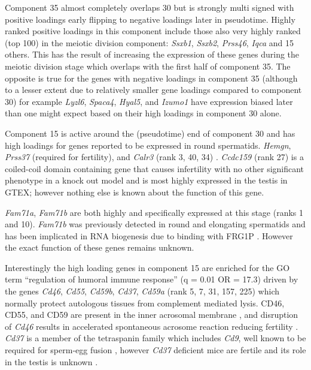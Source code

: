 Component 35 almost completely overlaps 30 but is strongly multi signed with positive loadings early flipping to negative loadings later in pseudotime.
Highly ranked positive loadings in this component include those also very highly ranked (top 100) in the meiotic division component: \textit{Ssxb1}, \textit{Ssxb2}, \textit{Prss46}, \textit{Iqca} and 15 others.
This has the result of increasing the expression of these genes during the meiotic division stage which overlaps with the first half of component 35.
The opposite is true for the genes with negative loadings in component 35 (although to a lesser extent due to relatively smaller gene loadings compared to component 30) for example \textit{Lyzl6}, \textit{Spaca4}, \textit{Hyal5}, and \textit{Izumo1} have expression biased later than one might expect based on their high loadings in component 30 alone.

Component 15 is active around the (pseudotime) end of component 30 and has high loadings for genes reported to be expressed in round spermatids.
\textit{Hemgn}, \textit{Prss37} (required for fertility), and \textit{Calr3} (rank 3, 40, 34) \parencite{Shen2013Prss37}.
\textit{Ccdc159} (rank 27) is a coiled-coil domain containing gene that causes infertility with no other significant phenotype in a knock out model and is most highly expressed in the testis in GTEX; however nothing else is known about the function of this gene.

\textit{Fam71a}, \textit{Fam71b} are both highly and specifically expressed at this stage (ranks 1 and 10).
\textit{Fam71b} was previously detected in round and elongating spermatids \parencite{Petit2015Combining} and has been implicated in RNA biogenesis due to binding with FRG1P \parencite{vanKoningsbruggen2007FRG1Pmediated}.
However the exact function of these genes remains unknown.

Interestingly the high loading genes in component 15 are enriched for the GO term ``regulation of humoral immune response'' (q = 0.01 OR = 17.3) driven by the genes \textit{Cd46}, \textit{Cd55}, \textit{Cd59b}, \textit{Cd37}, \textit{Cd59a} (rank 5, 7, 31, 157, 225) which normally protect autologous tissues from complement mediated lysis.
CD46, CD55, and CD59 are present in the inner acrosomal membrane \parencite{Cummerson2006complement}, and disruption of \textit{Cd46} results in accelerated spontaneous acrosome reaction reducing fertility \parencite{Inoue2003Disruption}.
\textit{Cd37} is a member of the tetraspanin family which includes \textit{Cd9}, well known to be required for sperm-egg fusion \parencite{Kaji2000gamete, Naour2000Severely, Miyado2000Requirement}, however \textit{Cd37} deficient mice are fertile and its role in the testis is unknown \parencite{Knobeloch2000Targeted}.

